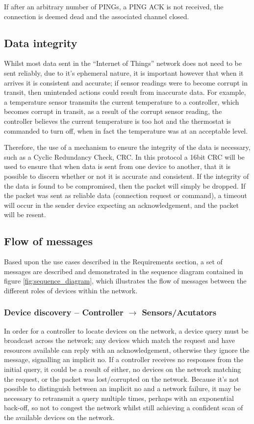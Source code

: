 If after an arbitrary number of PINGs, a PING ACK is not received, the connection is deemed dead and the associated channel closed.

\subsection{Data integrity}
\label{sub:data_integrity}
Whilst most data sent in the ``Internet of Things'' network does not need to be sent reliably, due to it's ephemeral nature, it is important however that when it arrives it is consistent and accurate; if sensor readings were to become corrupt in transit, then unintended actions could result from inaccurate data. For example, a temperature sensor transmits the current temperature to a controller, which becomes corrupt in transit, as a result of the corrupt sensor reading, the controller believes the current temperature is too hot and the thermostat is commanded to turn off, when in fact the temperature was at an acceptable level.

Therefore, the use of a mechanism to ensure the integrity of the data is necessary, such as a Cyclic Redundancy Check, CRC. In this protocol a 16bit CRC will be used to ensure that when data is sent from one device to another, that it is possible to discern whether or not it is accurate and consistent. If the integrity of the data is found to be compromised, then the packet will simply be dropped. If the packet was sent as reliable data (connection request or command), a timeout will occur in the sender device expecting an acknowledgement, and the packet will be resent. 



\subsection{Flow of messages} %
\label{sub:message_passing}
Based upon the use cases described in the Requirements section, a set of messages are described and demonstrated in the sequence diagram contained in figure \ref{fig:sequence_diagram}, which illustrates the flow of messages between the different roles of devices within the network.

\subsubsection{Device discovery -- Controller $\rightarrow$ Sensors/Acutators} %
\label{ssub:subsubsection_name}
In order for a controller to locate devices on the network, a device query must be broadcast across the network; any devices which match the request and have resources available can reply with an acknowledgement, otherwise they ignore the message, signalling an implicit no.
If a controller receives no responses from the initial query, it could be a result of either, no devices on the network matching the request, or the packet was lost/corrupted on the network. Because it's not possible to distinguish between an implicit no and a network failure, it may be necessary to retransmit a query multiple times, perhaps with an exponential back-off, so not to congest the network whilst still achieving a confident scan of the available devices on the network.

